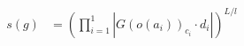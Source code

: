 \documentclass[preview]{standalone}
\begin{document}
\begin{align*}
s(g) &= \left(\prod_{i=1}^{1}\left|G(o(a_i))_{c_i}\cdot d_i\right|\right)^{L/l}
\end{align*}
\end{document}
